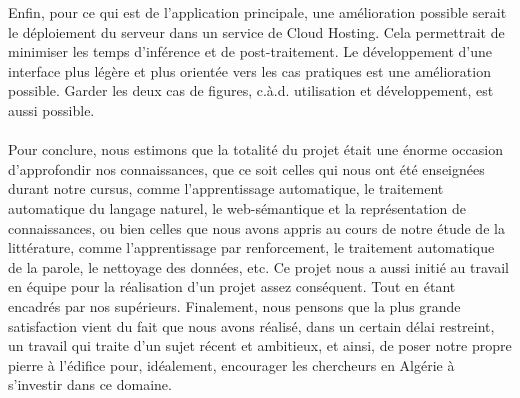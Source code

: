 \par
Enfin, pour ce qui est de l'application principale, une amélioration possible serait le déploiement du serveur dans un service de Cloud Hosting. Cela permettrait de minimiser les temps d'inférence et de post-traitement. Le développement d'une interface plus légère et plus orientée vers les cas pratiques est une amélioration possible. Garder les deux cas de figures, c.à.d. utilisation et développement, est aussi possible.

\paragraph{}
Pour conclure, nous estimons que la totalité du projet était une énorme occasion d'approfondir nos connaissances, que ce soit celles qui nous ont été enseignées durant notre cursus, comme l'apprentissage automatique, le traitement automatique du langage naturel, le web-sémantique et la représentation de connaissances, ou bien celles que nous avons appris au cours de notre étude de la littérature, comme l'apprentissage par renforcement, le traitement automatique de la parole, le nettoyage des données, etc. Ce projet nous a aussi initié au travail en équipe pour la réalisation d'un projet assez conséquent. Tout en étant encadrés par nos supérieurs.
Finalement, nous pensons que la plus grande satisfaction vient du fait que nous avons réalisé, dans un certain délai restreint, un travail qui traite d'un sujet récent et ambitieux, et ainsi, de poser notre propre pierre à l'édifice pour, idéalement, encourager les chercheurs en Algérie à s'investir dans ce domaine. 

